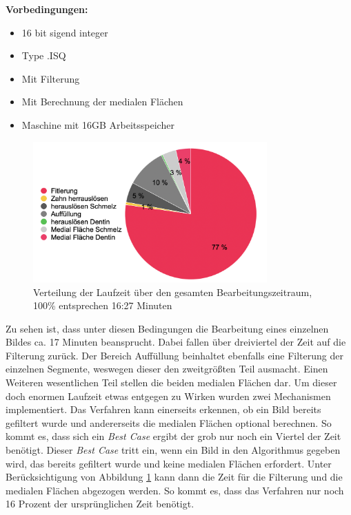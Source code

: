 \textbf{Vorbedingungen:}
\begin{itemize}
	\item 16 bit sigend integer

	\item Type .ISQ

	\item Mit Filterung

	\item Mit Berechnung der medialen Flächen

	\item Maschine mit 16\ac{GB} Arbeitsspeicher
\end{itemize}

\begin{figure}[h]
	\centering
	\includegraphics[width=0.8\textwidth]{img/laufzeit_diagramm.png}
	\caption{Verteilung der Laufzeit über den gesamten Bearbeitungszeitraum, 100\%
	entsprechen 16:27 Minuten}
	\label{fig:laufzeit}
\end{figure}

Zu sehen ist, dass unter diesen Bedingungen die Bearbeitung eines einzelnen
Bildes ca. 17 Minuten beansprucht. Dabei fallen über dreiviertel der Zeit auf
die Filterung zurück. Der Bereich Auffüllung beinhaltet ebenfalls eine Filterung
der einzelnen Segmente, weswegen dieser den zweitgrößten Teil ausmacht. Einen Weiteren
wesentlichen Teil stellen die beiden medialen Flächen dar. Um dieser doch
enormen Laufzeit etwas entgegen zu Wirken wurden zwei Mechanismen implementiert.
Das Verfahren kann einerseits erkennen, ob ein Bild bereits gefiltert wurde und
andererseits die medialen Flächen optional berechnen. So kommt es, dass sich ein
\textit{Best Case} ergibt der grob nur noch ein Viertel der Zeit benötigt.
Dieser \textit{Best Case} tritt ein, wenn ein Bild in den Algorithmus gegeben
wird, das bereits gefiltert wurde und keine medialen Flächen erfordert. Unter
Berücksichtigung von Abbildung \ref{fig:laufzeit} kann dann die Zeit für die
Filterung und die medialen Flächen abgezogen werden. So kommt es, dass das
Verfahren nur noch 16 Prozent der ursprünglichen Zeit benötigt.

